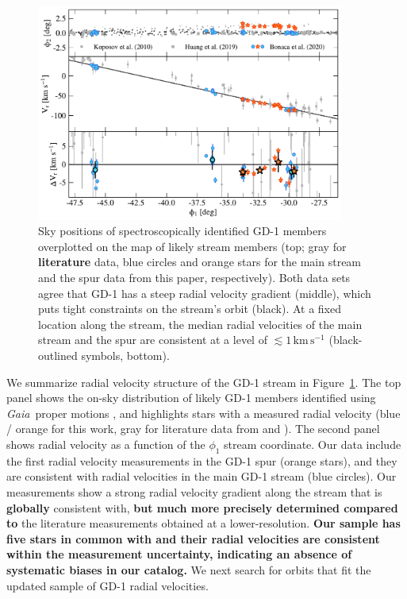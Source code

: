 \documentclass[twocolumn]{aastex63}
\newcommand{\gaia}{\textsl{Gaia}}
\newcommand{\kms}{\ensuremath{\textrm{km}\,\textrm{s}^{-1}}}
\newcommand{\changes}[1]{{\textbf{#1}}}
\begin{document}
\begin{figure}
\begin{center}
\includegraphics[width=0.9\textwidth]{gd1_kinematics.pdf}
\end{center}
\caption{Sky positions of spectroscopically identified GD-1 members overplotted on the map of likely stream members (top; gray for \changes{literature} data, blue circles and orange stars for the main stream and the spur data from this paper, respectively).
Both data sets agree that GD-1 has a steep radial velocity gradient (middle), which puts tight constraints on the stream's orbit (black).
At a fixed location along the stream, the median radial velocities of the main stream and the spur are consistent at a level of $\lesssim1\,\kms$ (black-outlined symbols, bottom).
}
\label{fig:vr}
\end{figure}

We summarize radial velocity structure of the GD-1 stream in Figure~\ref{fig:vr}.
The top panel shows the on-sky distribution of likely GD-1 members identified using \gaia\ proper motions \citep[small points,][]{pwb}, and highlights stars with a measured radial velocity (blue / orange for this work, gray for literature data from \citealt{koposov2010} and \citealt{huang2019}).
The second panel shows radial velocity as a function of the $\phi_1$ stream coordinate.
Our data include the first radial velocity measurements in the GD-1 spur (orange stars), and they are consistent with radial velocities in the main GD-1 stream (blue circles).
Our measurements show a strong radial velocity gradient along the stream that is \changes{globally} consistent with, \changes{but much more precisely determined compared to} the literature measurements obtained at a lower-resolution.
\changes{Our sample has five stars in common with \citet{huang2019} and their radial velocities are consistent within the measurement uncertainty, indicating an absence of systematic biases in our catalog.}
We next search for orbits that fit the updated sample of GD-1 radial velocities.
\end{document}
